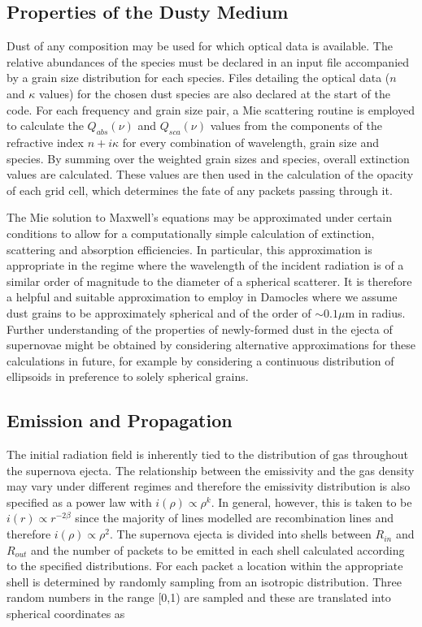 	
	\subsection{Properties of the Dusty Medium}
	Dust of any composition may be used for which optical data is available.  The relative abundances of the species must be declared in an input file accompanied by a grain size distribution for each species.  Files detailing the optical data ($n$ and $\kappa$ values) for the chosen dust species are also declared at the start of the code.  For each frequency and grain size pair, a Mie scattering routine is employed to calculate the $Q_{abs}(\nu)$ and $Q_{sca}(\nu)$ values from the components of the refractive index $n+i\kappa$ for every combination of wavelength, grain size and species.  By summing over the weighted grain sizes and species, overall extinction values are calculated.  These values are then used in the calculation of the opacity of each grid cell, which determines the fate of any packets passing through it.  
	
The Mie solution to Maxwell's equations may be approximated under certain conditions to allow for a computationally simple calculation of extinction, scattering and absorption efficiencies.  In particular, this approximation is appropriate in the regime where the wavelength of the incident radiation is of a similar order of magnitude to the diameter of a spherical scatterer.  It is therefore a helpful and suitable approximation to employ in Damocles where we assume dust grains to be approximately spherical and of the order of $\sim 0.1 \mu$m in radius.  Further understanding of the properties of newly-formed dust in the ejecta of supernovae might be obtained by considering alternative approximations for these calculations in future, for example by considering a continuous distribution of ellipsoids in preference to solely spherical grains.  

	


	\subsection{Emission and Propagation}
	\label{sctn:em_prop}
	The initial radiation field is inherently tied to the distribution of gas throughout the supernova ejecta.  The relationship between the emissivity and the gas density may vary under different regimes and therefore the emissivity distribution is also specified as a power law with $i(\rho) \propto \rho^{k}$.  In general, however, this is taken to be $i(r) \propto r ^{-2\beta}$ since the majority of lines modelled are recombination lines and therefore $i(\rho) \propto \rho^2$.  The supernova ejecta is divided into shells between $R_{in}$ and $R_{out}$ and the number of packets to be emitted in each shell calculated according to the specified distributions.  For each packet a location within the appropriate shell is determined by randomly sampling from an isotropic distribution.  Three random numbers in the range [0,1) are sampled and these are translated into spherical coordinates as 


